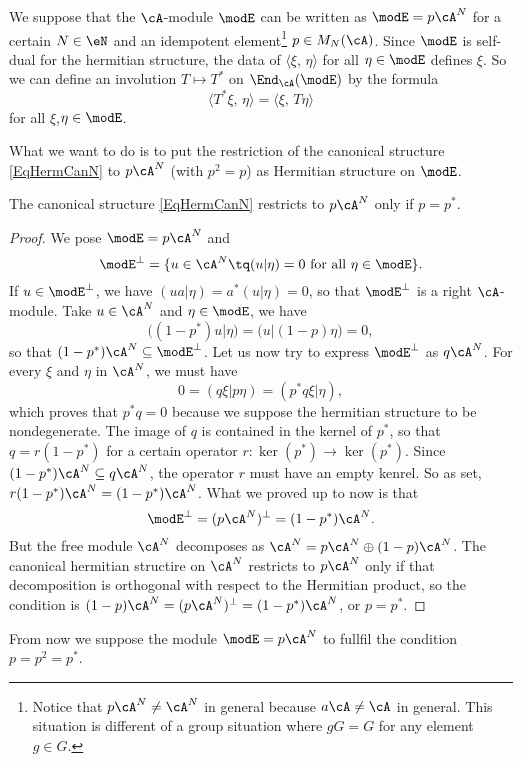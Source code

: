We suppose that the $\cA$-module $\modE$ can be written as $\modE=p\cA^N$ for a certain $N\in \eN$ and an idempotent element\footnote{Notice that $p\cA^N\neq\cA^N$ in general because $a\cA\neq\cA$ in general. This situation is different of a group situation where $gG=G$ for any element $g\in G$.} $p\in M_N(\cA)$. Since $\modE$ is self-dual for the hermitian structure, the data of $\langle \xi,\,\eta\rangle$ for all $\eta\in\modE$ defines $\xi$. So we can define an involution $T\mapsto T^*$ on $\End_{\cA}(\modE)$ by the formula
\[ 
  \langle T^*\xi,\,\eta\rangle=\langle \xi,\,T\eta\rangle
\]
for all $\xi$,$\eta\in\modE$.

What we want to do is to put the restriction of the canonical structure \eqref{EqHermCanN} to $p\cA^N$ (with $p^2=p$) as Hermitian structure on $\modE$. 

\begin{proposition}
The canonical structure \eqref{EqHermCanN} restricts to $p\cA^N$ only if $p=p^*$.
\end{proposition}

\begin{proof}
We pose $\modE=p\cA^N$ and 
\[ 
  \modE^{\perp}=\{ u\in\cA^N\tq (u|\eta)=0\text{ for all }\eta\in\modE \}.
\]
If $u\in\modE^{\perp}$, we have $(ua|\eta)=a^*(u|\eta)=0$, so that $\modE^{\perp}$ is a right $\cA$-module. Take $u\in\cA^N$ and $\eta\in\modE$, we have
\[ 
  \big( (1-p^*)u | \eta\big) =\big( u | (1-p)\eta\big) =0,
\]
so that $(1-p^*)\cA^N\subseteq\modE^{\perp}$. Let us now try to express $\modE^{\perp}$ as $q\cA^N$. For every $\xi$ and $\eta$ in $\cA^N$, we must have
\[ 
  0=( q\xi | p\eta) =( p^*q\xi | \eta),
\]
which proves that $p^*q=0$ because we suppose the hermitian structure to be nondegenerate. The image of $q$ is contained in the kernel of $p^*$, so that $q=r(1-p^*)$ for a certain operator $r\colon \ker(p^*)\to \ker(p^*)$. Since $(1-p^*)\cA^N\subseteq q\cA^N$, the operator $r$ must have an empty kenrel. So as set, $r(1-p^*)\cA^N=(1-p^*)\cA^N$. What we proved up to now is that
\[ 
  \modE^{\perp}=(p\cA^N)^{\perp}=(1-p^*)\cA^N.
\]
But the free module $\cA^N$ decomposes as $\cA^N=p\cA^N\oplus (1-p)\cA^N$. The canonical hermitian structire on $\cA^N$ restricts to $p\cA^N$ only if that decomposition is orthogonal with respect to the Hermitian product, so the condition is $(1-p)\cA^N=(p\cA^N)^{\perp}=(1-p^*)\cA^N$, or $p=p^*$.
\end{proof}

From now we suppose the module $\modE=p\cA^N$ to fullfil the condition $p=p^2=p^*$.

